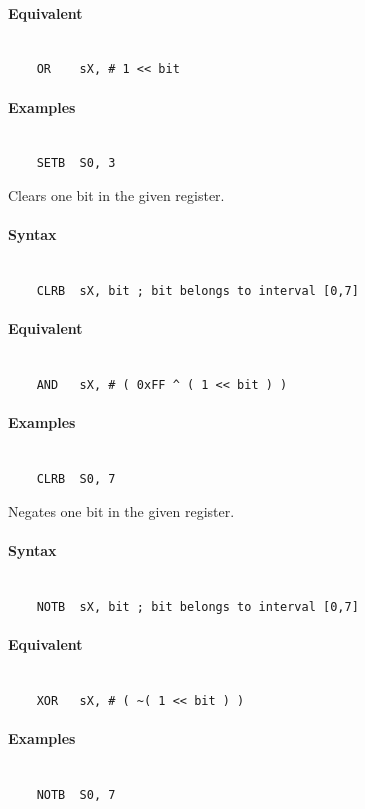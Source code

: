     \paragraph{Equivalent}
        ~\\
        \verb'    OR    sX, # 1 << bit'

    \paragraph{Examples}
        ~\\
        \verb'    SETB  S0, 3'

\clearpage
{}
    Clears one bit in the given register.

    \paragraph{Syntax}
        ~\\
        \verb'    CLRB  sX, bit ; bit belongs to interval [0,7]'

    \paragraph{Equivalent}
        ~\\
        \verb'    AND   sX, # ( 0xFF ^ ( 1 << bit ) )'

    \paragraph{Examples}
        ~\\
        \verb'    CLRB  S0, 7'

    Negates one bit in the given register.

    \paragraph{Syntax}
        ~\\
        \verb'    NOTB  sX, bit ; bit belongs to interval [0,7]'

    \paragraph{Equivalent}
        ~\\
        \verb'    XOR   sX, # ( ~( 1 << bit ) )'

    \paragraph{Examples}
        ~\\
        \verb'    NOTB  S0, 7'

